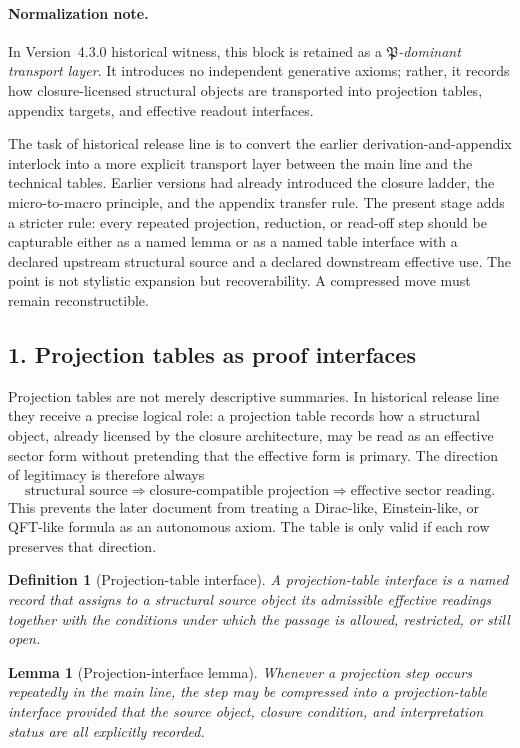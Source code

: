\documentclass[12pt,a4paper]{article}
\DeclareRobustCommand{\QSCver}[1]{archival stage}
\newtheorem{lemma}[theorem]{Lemma}
\newtheorem{definition}[theorem]{Definition}
\newcommand{\docversion}{4.3.0 historical witness}
\renewcommand{\QSCver}[1]{historical release line}
\begin{document}
\paragraph{Normalization note.} In Version~\docversion, this block is retained as a \emph{$\mathfrak P$-dominant transport layer}. It introduces no independent generative axioms; rather, it records how closure-licensed structural objects are transported into projection tables, appendix targets, and effective readout interfaces.


The task of \QSCver{v1.5.0} is to convert the earlier derivation-and-appendix
interlock into a more explicit transport layer between the main line and the
technical tables. Earlier versions had already introduced the closure ladder,
the micro-to-macro principle, and the appendix transfer rule. The present stage
adds a stricter rule: every repeated projection, reduction, or read-off step
should be capturable either as a named lemma or as a named table interface with
a declared upstream structural source and a declared downstream effective use.
The point is not stylistic expansion but recoverability. A compressed move must
remain reconstructible.

\subsection*{1. Projection tables as proof interfaces}
Projection tables are not merely descriptive summaries. In \QSCver{v1.5.0} they
receive a precise logical role: a projection table records how a structural
object, already licensed by the closure architecture, may be read as an
effective sector form without pretending that the effective form is primary.
The direction of legitimacy is therefore always
\[
\text{structural source} \Longrightarrow \text{closure-compatible projection}
\Longrightarrow \text{effective sector reading.}
\]
This prevents the later document from treating a Dirac-like, Einstein-like, or
QFT-like formula as an autonomous axiom. The table is only valid if each row
preserves that direction.

\begin{definition}[Projection-table interface]
A projection-table interface is a named record that assigns to a structural
source object its admissible effective readings together with the conditions
under which the passage is allowed, restricted, or still open.
\end{definition}

\begin{lemma}[Projection-interface lemma]
\label{lem:projection-interface-lemma}
Whenever a projection step occurs repeatedly in the main line, the step may be
compressed into a projection-table interface provided that the source object,
closure condition, and interpretation status are all explicitly recorded.
\end{lemma}
\end{document}
